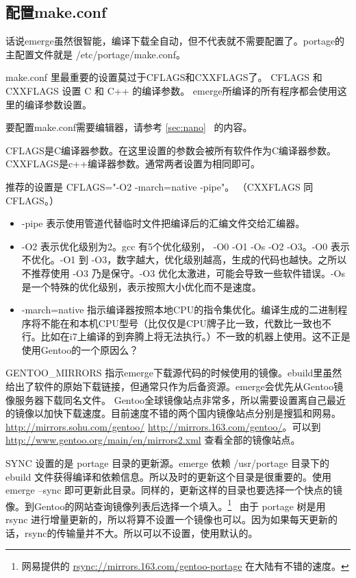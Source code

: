 \documentclass[amstex,twoside]{ctexbook}
\newcommand{\secref}[1]{ { \it节\ref{#1}~\nameref{#1}} }
\begin{document}
\subsection{配置make.conf}

话说emerge虽然很智能，编译下载全自动，但不代表就不需要配置了。portage的主配置文件就是 /etc/portage/make.conf。

make.conf 里最重要的设置莫过于CFLAGS和CXXFLAGS了。 
CFLAGS 和 CXXFLAGS 设置 C 和 C++ 的编译参数。
emerge所编译的所有程序都会使用这里的编译参数设置。

要配置make.conf需要编辑器，请参考 \secref{sec:nano} %
的内容。

CFLAGS是C编译器参数。在这里设置的参数会被所有软件作为C编译器参数。CXXFLAGS是c++编译器参数。通常两者设置为相同即可。

推荐的设置是 CFLAGS="-O2 -march=native -pipe"。
（CXXFLAGS 同 CFLAGS。）

\begin{itemize}
\item -pipe 表示使用管道代替临时文件把编译后的汇编文件交给汇编器。
\item -O2 表示优化级别为2。gcc 有5个优化级别， -O0 -O1 -Os -O2 -O3。-O0 表示不优化。-O1 到 -O3，数字越大，优化级别越高，生成的代码也越快。之所以不推荐使用 -O3 乃是保守。-O3 优化太激进，可能会导致一些软件错误。-Os是一个特殊的优化级别，表示按照大小优化而不是速度。
\item -march=native 指示编译器按照本地CPU的指令集优化。编译生成的二进制程序将不能在和本机CPU型号（比仅仅是CPU牌子比一致，代数比一致也不行。比如在i7上编译的到奔腾上将无法执行。）不一致的机器上使用。这不正是使用Gentoo的一个原因么？
\end{itemize}


GENTOO\_MIRRORS 指示emerge下载源代码的时候使用的镜像。ebuild里虽然给出了软件的原始下载链接，但通常只作为后备资源。emerge会优先从Gentoo镜像服务器下载同名文件。
Gentoo全球镜像站点非常多，所以需要设置离自己最近的镜像以加快下载速度。目前速度不错的两个国内镜像站点分别是搜狐和网易。\url{http://mirrors.sohu.com/gentoo/} \url{http://mirrors.163.com/gentoo/}。可以到 \url{http://www.gentoo.org/main/en/mirrors2.xml} 查看全部的镜像站点。

SYNC %
设置的是 portage 目录的更新源。emerge 依赖 /usr/portage 目录下的 ebuild 文件获得编译和依赖信息。所以及时的更新这个目录是很重要的。使用 emerge --sync 
即可更新此目录。同样的，更新这样的目录也要选择一个快点的镜像。到Gentoo的网站查询镜像列表后选择一个填入。\footnote{网易提供的 \url{rsync://mirrors.163.com/gentoo-portage} 在大陆有不错的速度。}~ 由于 portage 树是用 rsync 进行增量更新的，所以将算不设置一个镜像也可以。因为如果每天更新的话，rsync的传输量并不大。所以可以不设置，使用默认的。
\end{document}
